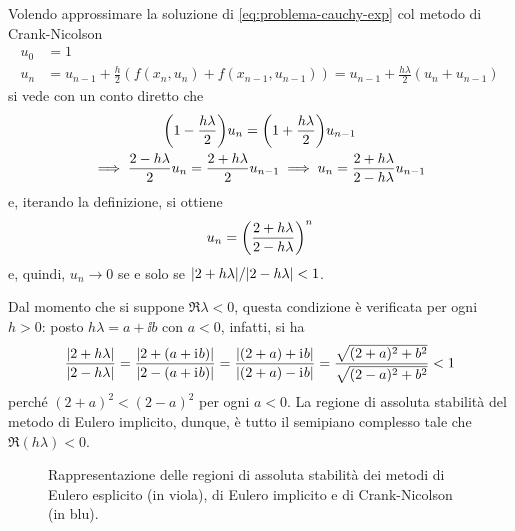 	\begin{esempio}
		Volendo approssimare la soluzione di \eqref{eq:problema-cauchy-exp} col metodo di Crank-Nicolson
		\begin{align*}
			u_0 &= 1 \\
			u_n &= u_{n - 1} + \frac{h}{2} (f (x_n, u_n) + f (x_{n - 1}, u_{n - 1})) = u_{n - 1} + \frac{h \lambda}{2} (u_n + u_{n - 1})
		\end{align*}
		si vede con un conto diretto che
		\begin{multline*}
			\qty(1 - \frac{h \lambda}{2}) u_n = \qty(1 + \frac{h \lambda}{2}) u_{n - 1} \\
			\implies \frac{2 - h \lambda}{2} u_n = \frac{2 + h \lambda}{2} u_{n - 1} \implies u_n = \frac{2 + h \lambda}{2 - h \lambda} u_{n - 1}
		\end{multline*}
		e, iterando la definizione, si ottiene
		\begin{equation*}
			u_n = \qty(\frac{2 + h \lambda}{2 - h \lambda})^n
		\end{equation*}
		e, quindi, \(u_n \to 0\) se e solo se \(\abs{2 + h \lambda} / \abs{2 - h \lambda} < 1\).
		
		Dal momento che si suppone \(\Re \lambda < 0\), questa condizione è verificata per ogni \(h > 0\): posto \(h \lambda = a + \ii b\) con \(a < 0\), infatti, si ha
		\begin{equation*}
			\frac{\abs{2 + h \lambda}}{\abs{2 - h \lambda}} = \frac{\abs{2 + (a + \mathrm{i}\mkern1mu b)}}{\abs{2 - (a + \mathrm{i}\mkern1mu b)}} = \frac{\abs{(2 + a) + \mathrm{i}\mkern1mu b}}{\abs{(2 + a) - \mathrm{i}\mkern1mu b}} = \frac{\sqrt{(2 + a)^2 + b^2}}{\sqrt{(2 - a)^2 + b^2}} < 1
		\end{equation*}
		perché \((2 + a)^2 < (2 - a)^2\) per ogni \(a < 0\). La regione di assoluta stabilità del metodo di Eulero implicito, dunque, è tutto il semipiano complesso tale che \(\Re (h \lambda) < 0\).
		
		\begin{figure}[tpb]
			\centering
			
			
			\caption{Rappresentazione delle regioni di assoluta stabilità dei metodi di Eulero esplicito (in viola), di Eulero implicito e di Crank-Nicolson (in blu).}
		\end{figure}
	\end{esempio}

